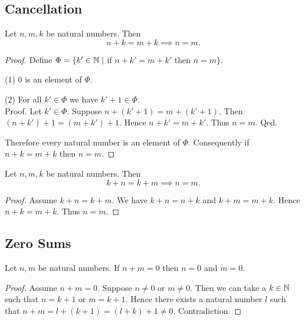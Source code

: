 \documentclass[10pt]{article}
\begin{document}
  \subsection{Cancellation}

  \begin{forthel}
    \begin{proposition}
      Let $n, m, k$ be natural numbers.
      Then \[ n + k = m + k \implies n = m. \]
    \end{proposition}
    \begin{proof}
      Define $\Phi = \{ k' \in \mathbb{N} \mid$ if $n + k' = m + k'$ then $n = m \}$.

      (1) $0$ is an element of $\Phi$.

      (2) For all $k' \in \Phi$ we have $k' + 1 \in \Phi$. \\
      Proof.
        Let $k' \in \Phi$.
        Suppose $n + (k' + 1) = m + (k' + 1)$.
        Then $(n + k') + 1 = (m + k') + 1$.
        Hence $n + k' = m + k'$.
        Thus $n = m$.
      Qed.

      Therefore every natural number is an element of $\Phi$.
      Consequently if $n + k = m + k$ then $n = m$.
    \end{proof}
  \end{forthel}

  \begin{forthel}
    \begin{corollary}
      Let $n, m, k$ be natural numbers.
      Then \[ k + n = k + m \implies n = m. \]
    \end{corollary}
    \begin{proof}
      Assume $k + n = k + m$.
      We have $k + n = n + k$ and $k + m = m + k$.
      Hence $n + k = m + k$.
      Thus $n = m$.
    \end{proof}
  \end{forthel}


  \subsection{Zero Sums}

  \begin{forthel}
    \begin{proposition}
      Let $n, m$ be natural numbers.
      If $n + m = 0$ then $n = 0$ and $m = 0$.
    \end{proposition}
    \begin{proof}
      Assume $n + m = 0$.
      Suppose $n \neq 0$ or $m \neq 0$.
      Then we can take a $k \in \mathbb{N}$ such that $n = k + 1$ or $m = k + 1$.
      Hence there exists a natural number $l$ such that
      $n + m
        = l + (k + 1)
        = (l + k) + 1
        \neq 0$.
      Contradiction.
    \end{proof}
  \end{forthel}
\end{document}
